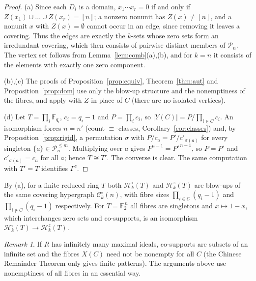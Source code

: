 \documentclass{amsart}
\theoremstyle{definition}
\theoremstyle{remark}
\newtheorem{remark}[theorem]{Remark}
\newcommand{\cC}{\mathcal{C}}
\newcommand{\cP}{\mathcal{P}}
\newcommand{\cH}{\mathcal{H}}
\newcommand{\nn}{[n]}
\begin{document}
\begin{proof}
(a) Since each $D_i$ is a domain, $x_1\cdots x_r=0$ if and only if $Z(x_1)\cup\dots\cup Z(x_r)=\nn$; a nonzero nonunit has $Z(x)\neq\nn$, and a nonunit $x$ with $Z(x)=\emptyset$ cannot occur in an edge, since removing it leaves a covering. Thus the edges are exactly the $k$-sets whose zero sets form an irredundant covering, which then consists of pairwise distinct members of $\cP_n$. The vertex set follows from Lemma~\ref{lem:comb}(a),(b), and for $k=n$ it consists of the elements with exactly one zero component.

(b),(c) The proofs of Proposition~\ref{prop:equiv}, Theorem~\ref{thm:aut} and Proposition~\ref{prop:dom} use only the blow-up structure and the nonemptiness of the fibres, and apply with $Z$ in place of $C$ (there are no isolated vertices).

(d) Let $T=\prod_i\mathbb F_{q_i}$, $c_i=q_i-1$ and $P=\prod_i c_i$, so $|Y(C)|=P/\prod_{i\in C}c_i$. An isomorphism forces $n=n'$ (count $\equiv$-classes, Corollary~\ref{cor:classes}) and, by Proposition~\ref{prop:rigid}, a permutation $\sigma$ with $P/c_a=P'/c'_{\sigma(a)}$ for every singleton $\{a\}\in\cP_n^{\le m}$. Multiplying over $a$ gives $P^{n-1}=P'^{\,n-1}$, so $P=P'$ and $c'_{\sigma(a)}=c_a$ for all $a$; hence $T\cong T'$. The converse is clear. The same computation with $T'=T$ identifies $\Gamma^z$.
\end{proof}

By (a), for a finite reduced ring $T$ both $\cH_k^\circ(T)$ and $\cH^z_k(T)$ are blow-ups of the same covering hypergraph $\cC_k^\circ(n)$, with fibre sizes $\prod_{i\in C}(q_i-1)$ and $\prod_{i\notin C}(q_i-1)$ respectively. For $T=\mathbb F_2^{\,n}$ all fibres are singletons and $x\mapsto 1-x$, which interchanges zero sets and co-supports, is an isomorphism $\cH_k^\circ(T)\to\cH^z_k(T)$.

\begin{remark}
If $R$ has infinitely many maximal ideals, co-supports are subsets of an infinite set and the fibres $X(C)$ need not be nonempty for all $C$ (the Chinese Remainder Theorem only gives finite patterns). The arguments above use nonemptiness of all fibres in an essential way.
\end{remark}
\end{document}

